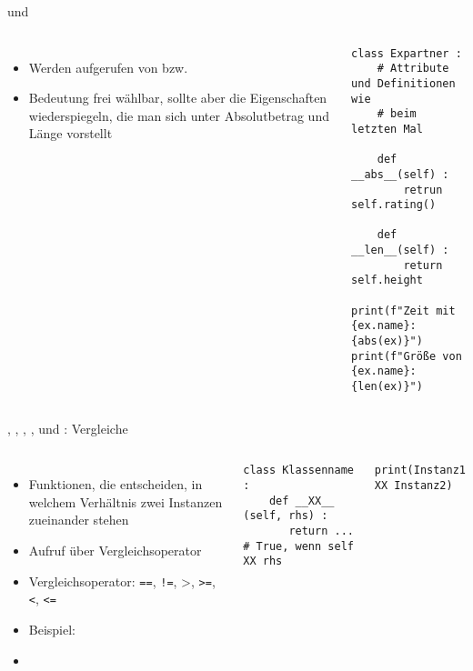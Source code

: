 
\begin{frame}[fragile]{ und }
%
\begin{columns}[T]
\begin{itemize}
\item Werden aufgerufen von  bzw. 
\item Bedeutung frei wählbar, sollte aber die Eigenschaften wiederspiegeln, die man sich unter Absolutbetrag und Länge vorstellt
\end{itemize}
%
\begin{codebox}
\begin{verbatim}
class Expartner :
    # Attribute und Definitionen wie
    # beim letzten Mal
    
    def __abs__(self) :
        retrun self.rating()
    
    def __len__(self) :
        return self.height

print(f"Zeit mit {ex.name}: {abs(ex)}")
print(f"Größe von {ex.name}: {len(ex)}")
\end{verbatim}
\end{codebox}
\end{columns}
%
\end{frame}


\begin{frame}[fragile]{, , , ,  und : Vergleiche}
%
\begin{columns}[T]
\begin{itemize}
\item Funktionen, die entscheiden, in welchem Verhältnis zwei Instanzen zueinander stehen
\item Aufruf über Vergleichsoperator
\item Vergleichsoperator: \texttt{==}, \texttt{!=}, >, \texttt{>=}, \texttt{<}, \texttt{<=}
\item Beispiel:  
\item[\Thus] 
\end{itemize}
%
\begin{codebox}
\begin{verbatim}
class Klassenname :
    def __XX__ (self, rhs) :
       return ... # True, wenn self XX rhs
\end{verbatim}
\end{codebox}
%
\begin{codebox}
\begin{verbatim}
print(Instanz1 XX Instanz2)
\end{verbatim}
\end{codebox}
\end{columns}
%
\end{frame}


